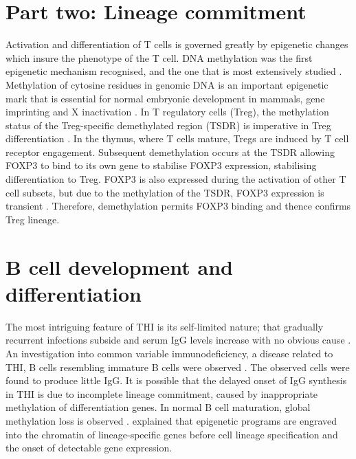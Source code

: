 \documentclass[12pt]{article}
\begin{document}
			
			
			
		\section{Part two: Lineage commitment}


			Activation and differentiation of T cells is governed greatly by epigenetic changes which insure the phenotype of the T cell.
			DNA methylation was the first epigenetic mechanism recognised, and the one that is most extensively studied \citep{Begin14}. 
			Methylation of cytosine residues in genomic DNA is an important epigenetic mark that is essential for normal embryonic development in mammals, gene imprinting and X inactivation \citep{EnLi14}. 
			In T regulatory cells (Treg), the methylation status of the Treg-specific demethylated region (TSDR) is imperative in Treg differentiation \citep{Polansky08}.
			In the thymus, where T cells mature, Tregs are induced by T cell receptor engagement. 
			Subsequent demethylation occurs at the TSDR allowing FOXP3 to bind to its own gene to stabilise FOXP3 expression, stabilising differentiation to Treg.
			FOXP3 is also expressed during the activation of other T cell subsets, but due to the methylation of the TSDR, FOXP3 expression is transient \citep{Ohkura13}.
			Therefore, demethylation permits FOXP3 binding and thence confirms Treg lineage.
			
			

			
			

	\section{B cell development and differentiation}
	
		The most intriguing feature of THI is its self-limited nature; that gradually recurrent infections subside and serum IgG levels increase with no obvious cause  \citep{Tiller78,Soothill68,Siegel81,McGeady87,Dressler89,Kowalczyk97,Dalal98}. 
		An investigation into common variable immunodeficiency, a disease related to THI, B cells resembling immature B cells were observed \citep{Fiorilli86}. 
		The observed cells were found to produce little IgG. 
		It is possible that the delayed onset of IgG synthesis in THI is due to incomplete lineage commitment, caused by inappropriate methylation of differentiation genes. 
		In normal B cell maturation, global methylation loss is observed \cite{Oakes16}.
		\citet{Tagoh04} explained that epigenetic programs are engraved into the chromatin of lineage-specific genes before cell lineage specification and the onset of detectable gene expression.
		
\end{document}
